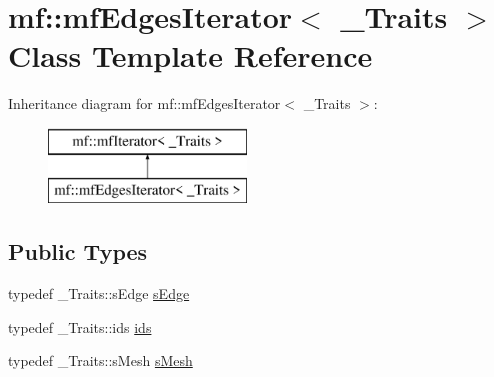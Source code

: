 \hypertarget{classmf_1_1mfEdgesIterator}{
\section{mf::mfEdgesIterator$<$ \_\-Traits $>$ Class Template Reference}
\label{classmf_1_1mfEdgesIterator}
}
Inheritance diagram for mf::mfEdgesIterator$<$ \_\-Traits $>$:\begin{figure}[H]
\begin{center}
\leavevmode
\includegraphics[height=2.000000cm]{classmf_1_1mfEdgesIterator}
\end{center}
\end{figure}
\subsection*{Public Types}
\begin{DoxyCompactItemize}
\item 
typedef \_\-Traits::sEdge \hyperlink{classmf_1_1mfEdgesIterator_afeb149d8a3c0efac598f1c13daf711b1}{sEdge}
\item 
typedef \_\-Traits::ids \hyperlink{classmf_1_1mfEdgesIterator_a6950c402f825ad11316256f59e5ae887}{ids}
\item 
typedef \_\-Traits::sMesh \hyperlink{classmf_1_1mfEdgesIterator_aef5fcd1a83c753089ba7c4e3d6f33733}{sMesh}
\end{DoxyCompactItemize}
